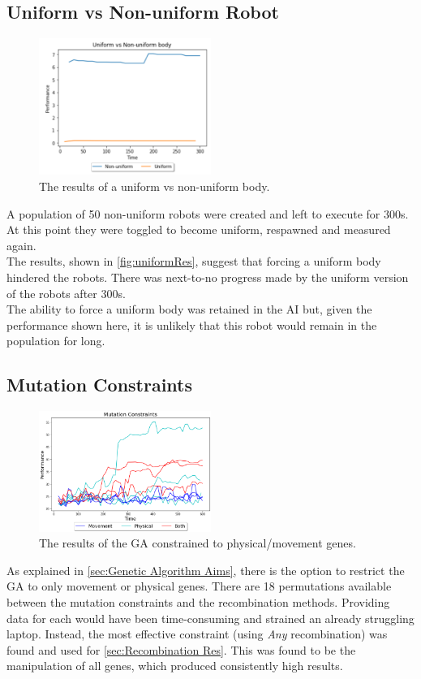 \documentclass{article}
\begin{document}
\subsection{Uniform vs Non-uniform Robot}
\label{sec:Uniform Res}
\begin{figure}
    \centering
    \includegraphics[width=0.5\textwidth]{uniformResults}
    \caption{The results of a uniform vs non-uniform body.}
    \label{fig:uniformRes}
\end{figure}
A population of 50 non-uniform robots were created and left to execute for 300s. At this point they were toggled to become uniform, respawned and measured again. \\
The results, shown in \autoref{fig:uniformRes}, suggest that forcing a uniform body hindered the robots. There was next-to-no progress made by the uniform version of the robots after 300s. \\
The ability to force a uniform body was retained in the AI but, given the performance shown here, it is unlikely that this robot would remain in the population for long.
\\[2\baselineskip]

\subsection{Mutation Constraints}
\label{sec:Mutation Res}
\begin{figure}
    \centering
    \includegraphics[width=0.5\textwidth]{mutationTypes}
    \caption{The results of the GA constrained to physical/movement genes.}
\end{figure}
As explained in \ref{sec:Genetic Algorithm Aims}, there is the option to restrict the GA to only movement or physical genes. There are 18 permutations available between the mutation constraints and the recombination methods. Providing data for each would have been time-consuming and strained an already struggling laptop. Instead, the most effective constraint (using \textit{Any} recombination) was found and used for \ref{sec:Recombination Res}.
This was found to be the manipulation of all genes, which produced consistently high results.
\end{document}
